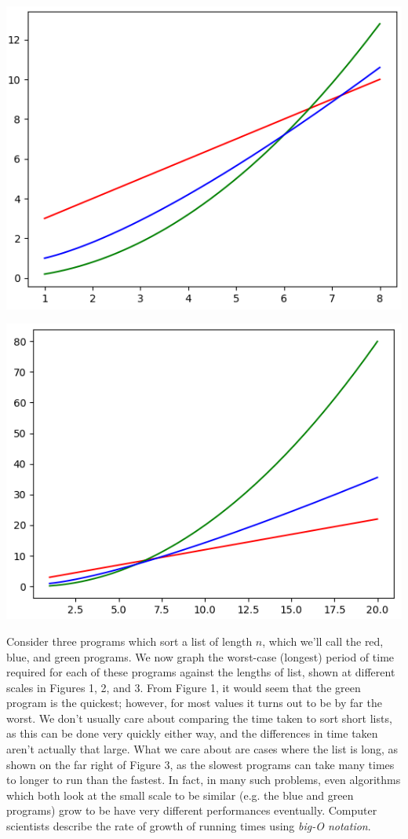 \documentclass{article}
\begin{document}
\includegraphics{mediumgraph.png}

\includegraphics{largegraph.png}

Consider three programs which sort a list of length \(n\), which we'll call the red, blue, and green programs. We now graph the worst-case (longest) period of time required for each of these programs against the lengths of list, shown at different scales in Figures 1, 2, and 3. From Figure 1, it would seem that the green program is the quickest; however, for most values it turns out to be by far the worst. We don't usually care about comparing the time taken to sort short lists, as this can be done very quickly either way, and the differences in time taken aren't actually that large. What we care about are cases where the list is long, as shown on the far right of Figure 3, as the slowest programs can take many times to longer to run than the fastest. In fact, in many such problems, even algorithms which both look at the small scale to be similar (e.g. the blue and green programs) grow to be have very different performances eventually. Computer scientists describe the rate of growth of running times using \textit{big-O notation}.
\end{document}
